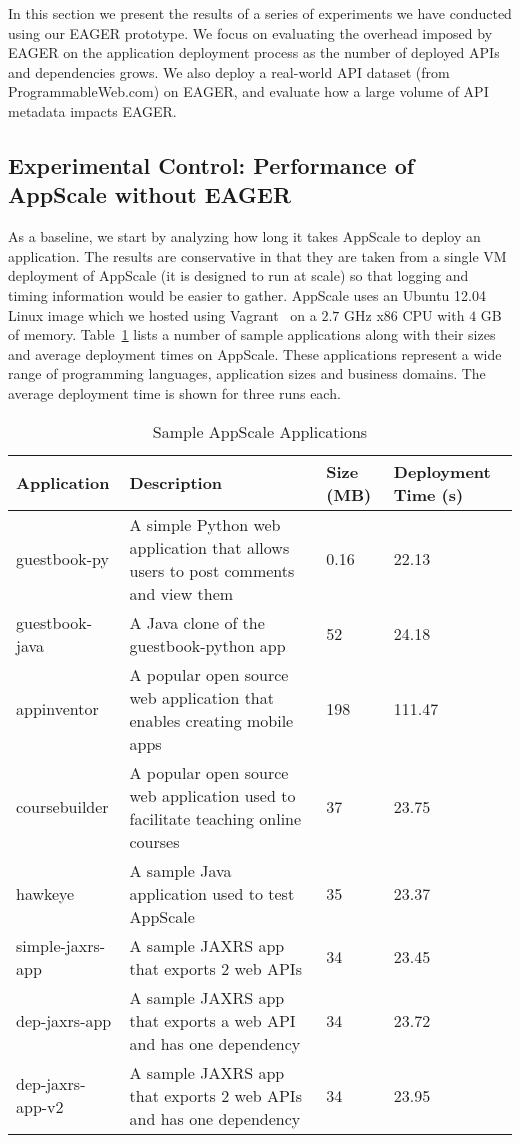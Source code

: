 In this section we present the results of a series of experiments we have conducted using our EAGER prototype. We focus
on evaluating the overhead imposed by EAGER on the application deployment process as the number of deployed APIs and dependencies
grows. We also deploy a real-world API dataset (from ProgrammableWeb.com) on EAGER, and evaluate how a large 
volume of API metadata impacts EAGER.

\subsection{Experimental Control: Performance of AppScale without EAGER}

As a baseline, we start by analyzing how long it takes AppScale to deploy an
application.  The results are conservative in that they are taken from a
single VM deployment of AppScale (it is designed to run at scale) so that
logging and timing information would be easier to gather.  AppScale uses an
Ubuntu 12.04 Linux image which we hosted using Vagrant~\cite{XXXvagrantXXX}    
on a $2.7$ GHz x86 CPU with $4$ GB of memory.
Table~\ref{tab:sample_apps} lists a number of sample
applications along with their sizes and average deployment times on AppScale.
These applications represent a wide range of programming languages,
application sizes and business domains. The average deployment time is shown
for three runs each.

\begin{table}[ht]
\begin{center}
\begin{tabular}{| p{1.5cm} | p{3cm} | p{0.5cm} | p{1.1cm} | }
\hline
Application & Description & Size (MB) & Deployment Time (s) \\ \hline
guestbook-py & A simple Python web application that allows users to post
comments and view them & 0.16 & 22.13 \\ \hline
guestbook-java & A Java clone of the guestbook-python app & 52 & 24.18 \\ \hline
appinventor & A popular open source web application that enables creating mobile apps & 198 & 111.47 \\ \hline
coursebuilder & A popular open source web application used to facilitate teaching online courses & 37 & 23.75 \\ \hline
hawkeye & A sample Java application used to test AppScale & 35 & 23.37 \\ \hline
simple-jaxrs-app & A sample JAXRS app that exports 2 web APIs & 34 & 23.45 \\ \hline
dep-jaxrs-app & A sample JAXRS app that exports a web API and has one dependency & 34 & 23.72 \\ \hline
dep-jaxrs-app-v2 & A sample JAXRS app that exports 2 web APIs and has one dependency & 34 & 23.95 \\ \hline
\end{tabular}
\end{center}
\caption{Sample AppScale Applications}
\label{tab:sample_apps}
\end{table}

